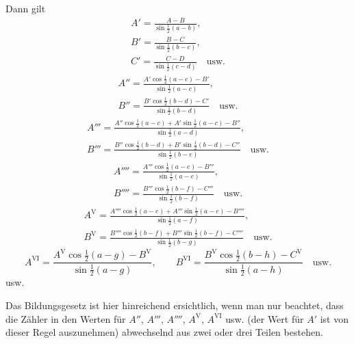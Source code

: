 Dann gilt
\[\begin{gathered}
A'=\frac{A-B}{\sin\tfrac12(a-b)},\\[5pt]
B'=\frac{B-C}{\sin\tfrac12(b-c)},\\[5pt]
C'=\frac{C-D}{\sin\tfrac12(c-d)}\quad\text{usw.}
\end{gathered}\]
\[\begin{gathered}
A''=\frac{A'\cos\tfrac12(a-c)-B'}{\sin\tfrac12(a-c)},\\[5pt]
B''=\frac{B'\cos\tfrac12(b-d)-C'}{\sin\tfrac12(b-d)}\quad\text{usw.}
\end{gathered}\]
\[\begin{gathered}
A'''=\frac{A''\cos\tfrac12(a-c)+A'\sin\tfrac12(a-c)-B''}{\sin\tfrac12(a-d)},\\[5pt]
B'''=\frac{B''\cos\tfrac12(b-d)+B'\sin\tfrac12(b-d)-C''}{\sin\tfrac12(b-e)}\quad\text{usw.}
\end{gathered}\]
\[\begin{gathered}
A''''=\frac{A'''\cos\tfrac12(a-e)-B'''}{\sin\tfrac12(a-e)},\\[5pt]
B''''=\frac{B'''\cos\tfrac12(b-f)-C'''}{\sin\tfrac12(b-f)}\quad\text{usw.}
\end{gathered}\]
\[\begin{gathered}
A^{\mathrm{V}}=\frac{A''''\cos\tfrac12(a-e)+A'''\sin\tfrac12(a-e)-B''''}{\sin\tfrac12(a-f)},\\[5pt]
B^{\mathrm{V}}=\frac{B''''\cos\tfrac12(b-f)+B'''\sin\tfrac12(b-f)-C''''}{\sin\tfrac12(b-g)}\quad\text{usw.}
\end{gathered}\]
\[
A^{\mathrm{VI}}=\frac{A^{\mathrm{V}}\cos\tfrac12(a-g)-B^{\mathrm{V}}}{\sin\tfrac12(a-g)},\qquad
B^{\mathrm{VI}}=\frac{B^{\mathrm{V}}\cos\tfrac12(b-h)-C^{\mathrm{V}}}{\sin\tfrac12(a-h)}\quad\text{usw.}
\]
usw.

Das Bildungsgesetz ist hier hinreichend ersichtlich, wenn man nur beachtet, dass die Zähler in den Werten für $A''$, $A'''$, $A''''$, $A^{\mathrm{V}}$, $A^{\mathrm{VI}}$ usw. (der Wert für $A'$ ist von dieser Regel auszunehmen) abwechselnd aus zwei oder drei Teilen bestehen.

\endgroup
